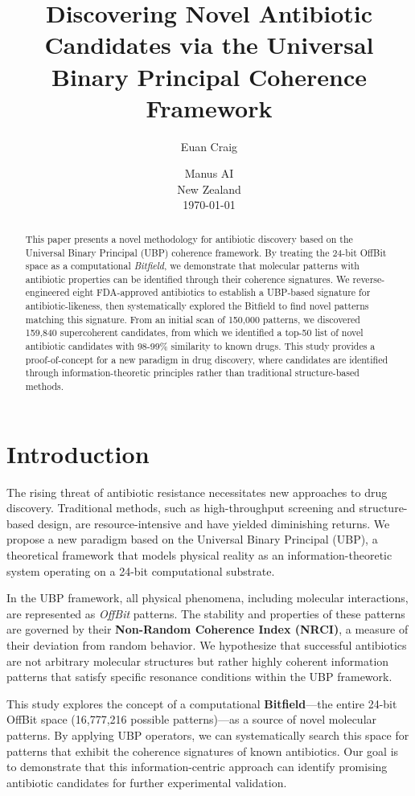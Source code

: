 \documentclass[12pt, a4paper]{article}
\title{Discovering Novel Antibiotic Candidates via the Universal Binary Principal Coherence Framework}
\author{Euan Craig \and Manus AI \\ \small{New Zealand} \\ \small{\today}}
\date{}
\begin{document}
\maketitle

\begin{abstract}
This paper presents a novel methodology for antibiotic discovery based on the Universal Binary Principal (UBP) coherence framework. By treating the 24-bit OffBit space as a computational \textit{Bitfield}, we demonstrate that molecular patterns with antibiotic properties can be identified through their coherence signatures. We reverse-engineered eight FDA-approved antibiotics to establish a UBP-based signature for antibiotic-likeness, then systematically explored the Bitfield to find novel patterns matching this signature. From an initial scan of 150,000 patterns, we discovered 159,840 supercoherent candidates, from which we identified a top-50 list of novel antibiotic candidates with 98-99\% similarity to known drugs. This study provides a proof-of-concept for a new paradigm in drug discovery, where candidates are identified through information-theoretic principles rather than traditional structure-based methods.
\end{abstract}

\tableofcontents

\section{Introduction}

The rising threat of antibiotic resistance necessitates new approaches to drug discovery. Traditional methods, such as high-throughput screening and structure-based design, are resource-intensive and have yielded diminishing returns. We propose a new paradigm based on the Universal Binary Principal (UBP), a theoretical framework that models physical reality as an information-theoretic system operating on a 24-bit computational substrate.

In the UBP framework, all physical phenomena, including molecular interactions, are represented as \textit{OffBit} patterns. The stability and properties of these patterns are governed by their \textbf{Non-Random Coherence Index (NRCI)}, a measure of their deviation from random behavior. We hypothesize that successful antibiotics are not arbitrary molecular structures but rather highly coherent information patterns that satisfy specific resonance conditions within the UBP framework.

This study explores the concept of a computational \textbf{Bitfield}---the entire 24-bit OffBit space (16,777,216 possible patterns)---as a source of novel molecular patterns. By applying UBP operators, we can systematically search this space for patterns that exhibit the coherence signatures of known antibiotics. Our goal is to demonstrate that this information-centric approach can identify promising antibiotic candidates for further experimental validation.
\end{document}
